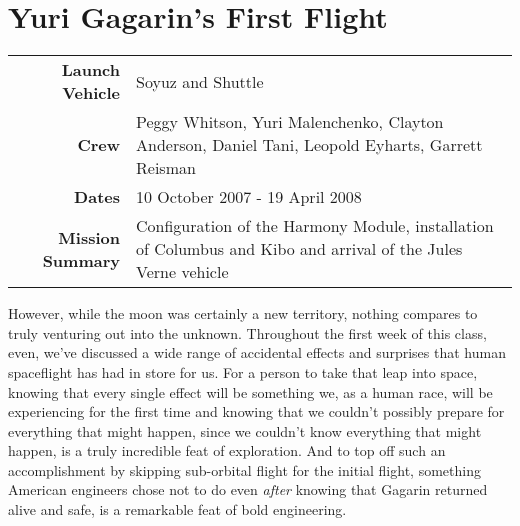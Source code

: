 \documentclass{article}
\begin{document}
  \section{Yuri Gagarin's First Flight}

  \begin{center}
    \begin{tabular}{ >{\bfseries}r | p{3.5in} }
      \hline
      Launch Vehicle & Soyuz and Shuttle \\
      Crew & Peggy Whitson, 
             Yuri Malenchenko, 
             Clayton Anderson, 
             Daniel Tani,
             Leopold Eyharts, 
             Garrett Reisman \\
      Dates & 10 October 2007 - 19 April 2008 \\
      Mission Summary & Configuration of the Harmony Module, installation of
      Columbus and Kibo and arrival of the Jules Verne vehicle \\
      \hline
    \end{tabular}
  \end{center}

  However, while the moon was certainly a new territory, nothing compares to truly
  venturing out into the unknown. Throughout the first week of this class, even,
  we've discussed a wide range of accidental effects and surprises that human
  spaceflight has had in store for us. For a person to take that leap into space,
  knowing that every single effect will be something we, as a human race, will be
  experiencing for the first time and knowing that we couldn't possibly prepare
  for everything that might happen, since we couldn't know everything that might
  happen, is a truly incredible feat of exploration. And to top off such an
  accomplishment by skipping sub-orbital flight for the initial flight, something
  American engineers chose not to do even \textit{after} knowing that Gagarin returned
  alive and safe, is a remarkable feat of bold engineering.

\end{document}
